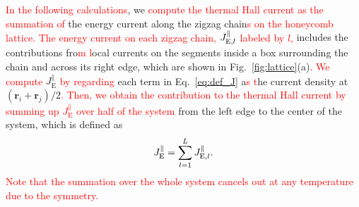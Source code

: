 \documentclass[twocolumn,superscriptaddress,showpacs, longbibliography, aps, prb]{revtex4-2}
\newcommand{\red}[1]{\textcolor{red}{#1}}
\newcommand{\blue}[1]{\textcolor{blue}{#1}}
\newcommand{\orange}[1]{\textcolor{orange}{#1}}
\begin{document}
\red{In the following calculations}, we %
\red{compute the thermal Hall current as the summation of} the energy current %
along the zigzag chain\red{s on the honeycomb lattice. %
The energy current on each zigzag chain, $J_{{\rm E},l}^\parallel$ labeled by $l$,} includes the contributions fro\red{m %
l}ocal currents on the segments inside %
a box surrounding the chain and across its right edge, which are shown in Fig.~\ref{fig:lattice}(a)\red{. 
We compute} {$J_{\mathrm{E}}^{\parallel}$} %
\red{by regarding} each term in Eq.~\eqref{eq:def_J} %
 a\red{s %
t}he current density at $(\bm{r}_i + \bm{r}_j)/2$\red{. Then, we obtain the contribution to the thermal Hall current by %
summing up $J_{\mathrm{E}}^{\parallel}$ over half of the system} from the left edge to the center of the system, which is defined as
\begin{align}
J_{\rm E}^\parallel=\sum_{l=1}^{L}J_{{\rm E},l}^\parallel.
\label{eq:JE}
\end{align} 
\red{Note that the summation over the whole system cancels out at any temperature due to the symmetry.}
\end{document}
